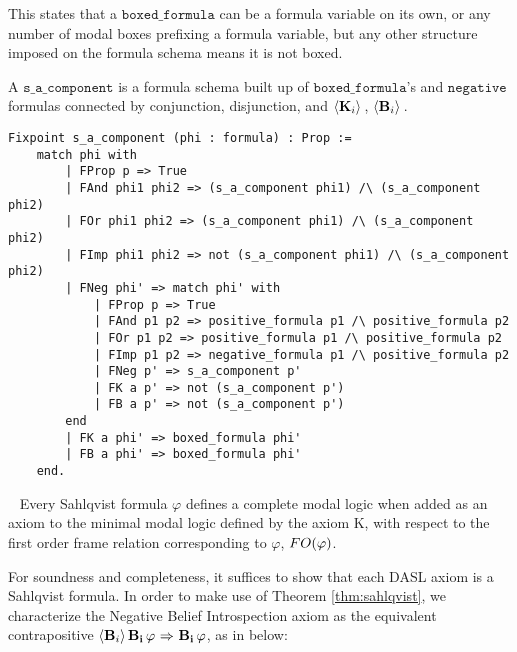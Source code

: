 This states that a $\mathtt{boxed\_formula}$ can be a formula variable on its own, or any number of modal boxes prefixing a formula variable, but any other structure imposed on the formula schema means it is not boxed.

A $\mathtt{s\_a\_component}$ is a formula schema built up of $\mathtt{boxed\_formula}$'s and $\mathtt{negative}$ formulas connected by conjunction, disjunction, and $\langle \mathbf{K}_{i} \rangle\,$, $\langle \mathbf{B}_{i} \rangle\,$.

\begin{tcolorbox}
	\begin{lstlisting}[language=Coq]
Fixpoint s_a_component (phi : formula) : Prop :=
	match phi with
		| FProp p => True
		| FAnd phi1 phi2 => (s_a_component phi1) /\ (s_a_component phi2)
		| FOr phi1 phi2 => (s_a_component phi1) /\ (s_a_component phi2)
		| FImp phi1 phi2 => not (s_a_component phi1) /\ (s_a_component phi2)
		| FNeg phi' => match phi' with
			| FProp p => True
			| FAnd p1 p2 => positive_formula p1 /\ positive_formula p2
			| FOr p1 p2 => positive_formula p1 /\ positive_formula p2
			| FImp p1 p2 => negative_formula p1 /\ positive_formula p2
			| FNeg p' => s_a_component p'
			| FK a p' => not (s_a_component p')
			| FB a p' => not (s_a_component p')
		end
		| FK a phi' => boxed_formula phi'
		| FB a phi' => boxed_formula phi'
	end.
	\end{lstlisting}	
	
\end{tcolorbox}

\begin{theorem}~\label{thm:sahlqvist}
	Every Sahlqvist formula $\varphi$ defines a complete modal logic when added as an axiom to the minimal modal logic defined by the axiom K, with respect to the first order frame relation corresponding to $\varphi$,  $\mathnormal{FO}(\varphi)$.
\end{theorem}

For soundness and completeness, it suffices to show that each DASL axiom is a Sahlqvist formula. In order to make use of Theorem \ref{thm:sahlqvist}, we characterize the Negative Belief Introspection axiom as the equivalent contrapositive $\langle \mathbf{B}_{i} \rangle\,\mathbf{B}_{\mathbf{i}}\,\varphi {\ \Rightarrow \ } \mathbf{B}_{\mathbf{i}}\,\varphi$, as in below:

